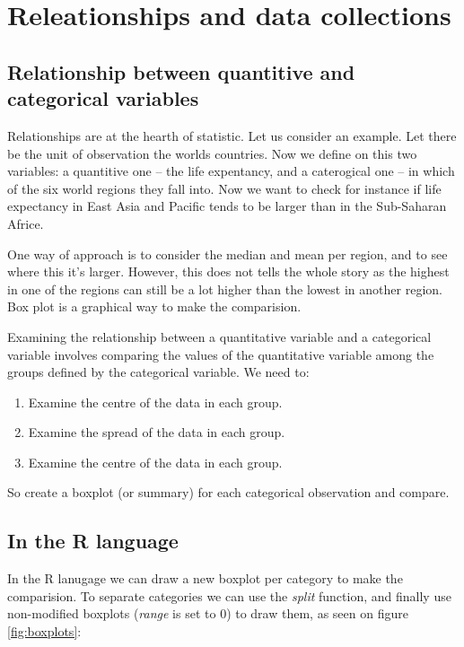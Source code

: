 \section{Releationships and data collections}

\subsection{Relationship between quantitive and categorical variables}

Relationships are at the hearth of statistic. Let us consider an example. Let
there be the unit of observation the worlds countries. Now we define on this two
variables: a quantitive one -- the life expentancy, and a caterogical one -- in
which of the six world regions they fall into. Now we want to check for instance
if life expectancy in East Asia and Pacific tends to be larger than in the
Sub-Saharan Africe. 

One way of approach is to consider the median and mean per region, and to see
where this it's larger. However, this does not tells the whole story as the
highest in one of the regions can still be a lot higher than the lowest in
another region. Box plot is a graphical way to make the comparision.

Examining the relationship between a quantitative variable and a categorical
variable involves comparing the values of the quantitative variable among the
groups defined by the categorical variable. We need to:

\begin{enumerate}
  \item Examine the centre of the data in each group.
  \item Examine the spread of the data in each group.
  \item Examine the centre of the data in each group. 
\end{enumerate}

So create a boxplot (or summary) for each categorical observation and compare.

\subsection{In the R language}

In the R lanugage we can draw a new boxplot per category to make the
comparision. To separate categories we can use the \emph{split} function, and
finally use non-modified boxplots (\emph{range} is set to $0$) to draw them,
as seen on figure \ref{fig:boxplots}: 

